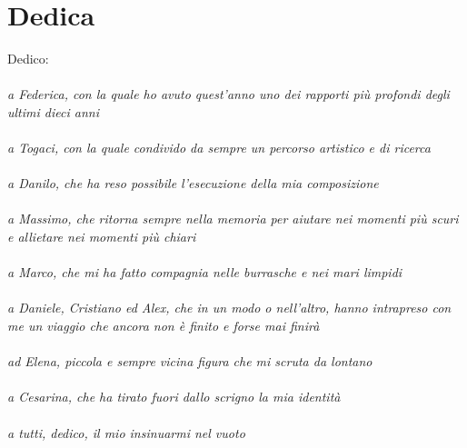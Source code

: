 
\chapter*{Dedica}


Dedico: \\
\\
\textit{
a Federica, con la quale ho avuto quest'anno uno dei rapporti più profondi degli ultimi dieci anni \\
\\
a Togaci, con la quale condivido da sempre un percorso artistico e di ricerca \\
\\
a Danilo, che ha reso possibile l'esecuzione della mia composizione \\
\\
a Massimo, che ritorna sempre nella memoria per aiutare nei momenti più scuri e allietare nei momenti più chiari \\
\\
a Marco, che mi ha fatto compagnia nelle burrasche e nei mari limpidi \\
\\
a Daniele, Cristiano ed Alex, che in un modo o nell'altro, hanno intrapreso con me un viaggio che ancora non è finito e forse mai finirà \\
\\
ad Elena, piccola e sempre vicina figura che mi scruta da lontano \\
\\
a Cesarina, che ha tirato fuori dallo scrigno la mia identità \\
\\
a tutti, dedico, il mio insinuarmi nel vuoto
}